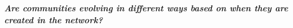\textbf{\textit{Are communities evolving in different ways based on when they are created in the network?}}



